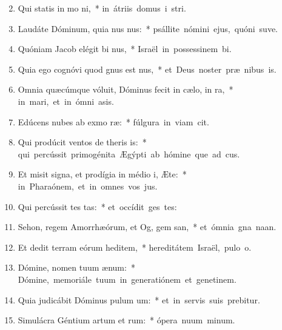 \begin{flushleft}
\begin{enumerate}[leftmargin=*]
\setcounter{enumi}{1}

\item Qui statis in mo ni,~* \mbox{in átriis domus i stri.}
\item Laudáte Dóminum, quia nus nus:~* \mbox{psállite nómini ejus, quóni suve.}
\item Quóniam Jacob elégit bi nus,~* \mbox{Israël in possessinem bi.}
\item Quia ego cognóvi quod gnus est nus,~* \mbox{et Deus noster præ nibus is.}
\item Omnia quæcúmque vóluit, Dóminus fecit in cælo,  in ra,~* \mbox{in mari, et in ómni asis.}
\item Edúcens nubes ab exmo ræ:~* \mbox{fúlgura in viam cit.}
\item Qui prodúcit ventos de theris is:~* \mbox{qui percússit primogénita Ægýpti ab hómine que ad cus.}
\item Et misit signa, et prodígia in médio i, Æte:~* \mbox{in Pharaónem, et in omnes vos jus.}
\item Qui percússit tes tas:~* \mbox{et occídit ges tes:}
\item Sehon, regem Amorrhæórum, et Og, gem san,~* \mbox{et ómnia gna naan.}
\item Et dedit terram eórum heditem,~* \mbox{hereditátem Israël, pulo o.}
\item Dómine, nomen tuum  ænum:~* \mbox{Dómine, memoriále tuum in generatiónem et genetinem.}
\item Quia judicábit Dóminus pulum um:~* \mbox{et in servis suis prebitur.}
\item Simulácra Géntium artum et rum:~* \mbox{ópera nuum minum.}

\end{enumerate}
\end{flushleft}
